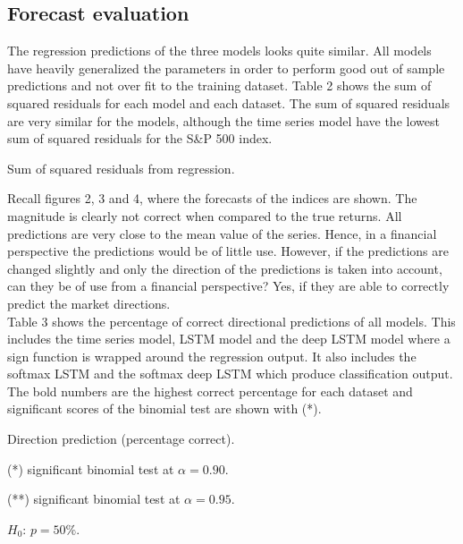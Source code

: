\documentclass[12pt, letterpaper]{amsart}%
\begin{document}
\subsection{Forecast evaluation}
The regression predictions of the three models looks quite similar. All models have heavily generalized the parameters in order to perform good out of sample predictions and not over fit to the training dataset. Table 2 shows the sum of squared residuals for each model and each dataset. The sum of squared residuals are very similar for the models, although the time series model have the lowest sum of squared residuals for the S\&P 500 index.

\begin{table}[H]
\centering
\caption{Sum of squared residuals from regression.}
\end{table}

Recall figures 2, 3 and 4, where the forecasts of the indices are shown. The magnitude is clearly not correct when compared to the true returns. All predictions are very close to the mean value of the series. Hence, in a financial perspective the predictions would be of little use. However, if the predictions are changed slightly and only the direction of the predictions is taken into account, can they be of use from a financial perspective? Yes, if they are able to correctly predict the market directions.
\\

Table 3 shows the percentage of correct directional predictions of all models. This includes the time series model, LSTM model and the deep LSTM model where a sign function is wrapped around the regression output. It also includes the softmax LSTM and the softmax deep LSTM which produce classification output. The bold numbers are the highest correct percentage for each dataset and significant scores of the binomial test are shown with (*).

\begin{table}[H]
\centering
\caption{Direction prediction (percentage correct).}
	\begin{tablenotes}
	\small
	\item  (*) significant binomial test at $\alpha=0.90$.
	\item (**) significant binomial test at $\alpha=0.95$.
	\item $H_0$: $p = 50\%$.
	\end{tablenotes}
\end{table}
\end{document}
